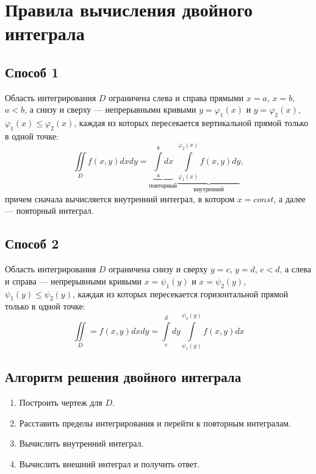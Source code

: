 \documentclass[a4paper,12pt,oneside]{extbook}
\theoremstyle{numbered}
\theoremstyle{unnumbered}
\theoremstyle{named}
\theoremstyle{unnumbered}
\theoremstyle{named}
\theoremstyle{named}
\theoremstyle{named}
\begin{document}
\section{Правила вычисления двойного интеграла}%
\label{sec:Правила вычисления двойного интеграла}

\subsection{Способ 1}%
\label{sub:Способ 1}

Область интегрирования \(D\) ограничена слева и справа прямыми \(x = a\), \(x = b\), \(a < b\), а снизу и сверху — непрерывными кривыми \(y = \varphi_1(x)\) и \(y = \varphi_2(x)\), \(\varphi_1(x) \leq \varphi_2(x)\), каждая из которых пересекается вертикальной прямой только в одной точке:
\begin{equation}
    \iint\limits_D f(x, y)dxdy = \underbrace{\int\limits_a^b dx}_\text{повторный} \underbrace{\int\limits_{\varphi_1(x)}^{\varphi_2(x)} f(x, y)dy}_\text{внутренний},
\end{equation}
причем сначала вычисляется внутренний интеграл, в котором \(x = const\), а далее — повторный интеграл.

\subsection{Способ 2}%
\label{sub:Способ 2}

Область интегрирования \(D\) ограничена снизу и сверху \(y = c\), \(y = d\), \(c < d\), а слева и справа — непрерывными кривыми \(x = \psi_1(y)\) и \(x = \psi_2(y)\), \(\psi_1(y) \leq \psi_2(y)\), каждая из которых пересекается горизонтальной прямой только в одной точке:
\begin{equation}
    \iint\limits_D = f(x, y)dxdy = \int\limits_c^d dy \int\limits_{\psi_1(y)}^{\psi_2(y)} f(x, y)dx
\end{equation}

\subsection{Алгоритм решения двойного интеграла}%
\label{sub:Алгоритм решения двойного интеграла}

\begin{enumerate}
    \item {Построить чертеж для \(D\).}
    \item {Расставить пределы интегрирования и перейти к повторным интегралам.}
    \item {Вычислить внутренний интеграл.}
    \item {Вычислить внешний интеграл и получить ответ.}
\end{enumerate}
\end{document}
